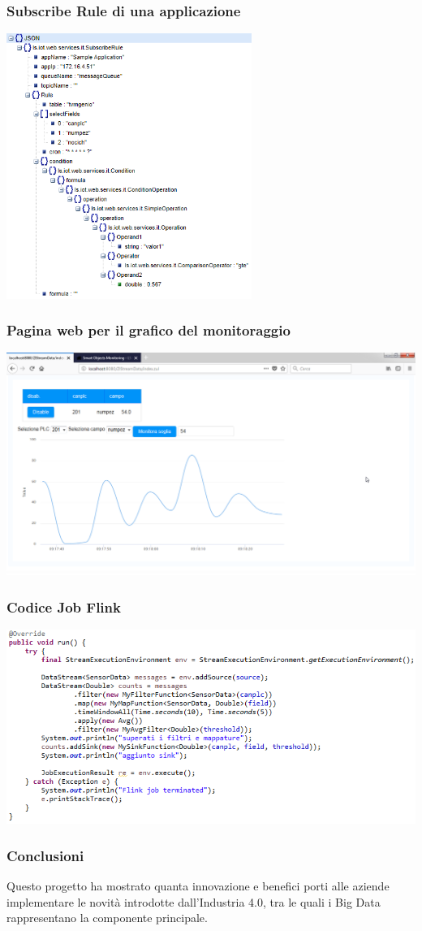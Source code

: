 \documentclass{beamer}
\begin{document}
\begin{frame}
\frametitle{Subscribe Rule di una applicazione}
\includegraphics[width=0.6\textwidth]{images/subscribe-json-1.png}
\end{frame}

\begin{frame}
\frametitle{Pagina web per il grafico del monitoraggio}
\includegraphics[width=1\textwidth]{images/grafico-zk.png}
\end{frame}

\begin{frame}
\frametitle{Codice Job Flink}
\includegraphics[width=1\textwidth]{images/flink-job.png}
\end{frame}

\begin{frame}
	\frametitle{Conclusioni}
	Questo progetto ha mostrato quanta innovazione e benefici porti alle aziende implementare le novità introdotte dall’Industria 4.0, tra le quali i Big Data rappresentano la componente principale.
\end{frame}

\end{document}
